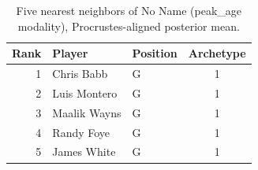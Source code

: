 \begin{table}[htbp]
  \centering\small
  \begin{tabular}{rllc}
    \toprule
    Rank & Player & Position & Archetype \\
    \midrule
    1 & Chris Babb & G & 1 \\
    2 & Luis Montero & G & 1 \\
    3 & Maalik Wayns & G & 1 \\
    4 & Randy Foye & G & 1 \\
    5 & James White & G & 1 \\
    \bottomrule
  \end{tabular}
  \caption{Five nearest neighbors of No Name (peak_age modality), Procrustes-aligned posterior mean.}
  \label{tab:No_Name_neighbors_peak_age}
\end{table}

